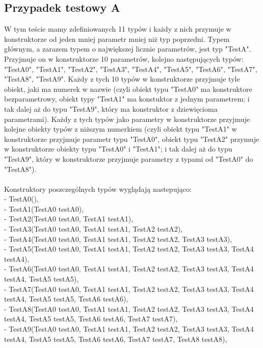 \documentclass[12pt]{article}
\begin{document}
\subsection{Przypadek testowy A}
W tym teście mamy zdefiniowanych 11 typów i każdy z nich przymuje w konstruktorze od jeden mniej parametr mniej niż typ poprzedni. Typem głównym, a zarazem typem o największej licznie parametrów, jest typ "TestA". Przyjmuje on w konstruktorze 10 parametrów, kolejno następujących typów: "TestA0", "TestA1", "TestA2", "TestA3", "TestA4", "TestA5", "TestA6", "TestA7", "TestA8", "TestA9". Każdy z tych 10 typów w konstruktorze przyjmuje tyle obiekt, jaki ma numerek w nazwie (czyli obiekt typu "TestA0" ma konstruktore bezparametrowy, obiekt typy "TestA1" ma konstuktor z jednym parametrem; i tak dalej aż do typu "TestA9", który ma konstruktor z dziewięcioma parametrami). Każdy z tych typów jako parametry w konstruktorze przyjmuje kolejne obiekty typów z niższym numerkiem (czyli obiekt typu "TestA1" w konstruktorze przyjmuje parametr typu "TestA0", obiekt typu "TestA2" przymuje w konstruktorze obiekty typu "TestA0" i "TestA1";  i tak dalej aż do typu "TestA9", który w konstruktorze przyjmuje parametry z typami od "TestA0" do "TestA8").\\
\\
Konstruktory poszczególnych typów wyglądają nastepująco:\\
- TestA0(),\\
- TestA1(TestA0 testA0),\\
- TestA2(TestA0 testA0, TestA1 testA1),\\
- TestA3(TestA0 testA0, TestA1 testA1, TestA2 testA2),\\
- TestA4(TestA0 testA0, TestA1 testA1, TestA2 testA2, TestA3 testA3),\\
- TestA5(TestA0 testA0, TestA1 testA1, TestA2 testA2, TestA3 testA3, TestA4 testA4),\\
- TestA6(TestA0 testA0, TestA1 testA1, TestA2 testA2, TestA3 testA3, TestA4 testA4, TestA5 testA5),\\
- TestA7(TestA0 testA0, TestA1 testA1, TestA2 testA2, TestA3 testA3, TestA4 testA4, TestA5 testA5, TestA6 testA6),\\
- TestA8(TestA0 testA0, TestA1 testA1, TestA2 testA2, TestA3 testA3, TestA4 testA4, TestA5 testA5, TestA6 testA6, TestA7 testA7),\\
- TestA9(TestA0 testA0, TestA1 testA1, TestA2 testA2, TestA3 testA3, TestA4 testA4, TestA5 testA5, TestA6 testA6, TestA7 testA7, TestA8 testA8),\\
\end{document}
